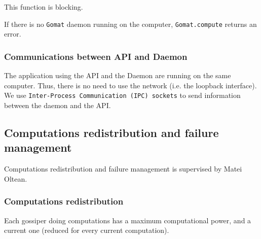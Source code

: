 \documentclass[a4paper,12pt]{article}
\newcommand{\Gomat}{\texttt{Gomat}\xspace}
\begin{document}
    This function is blocking.

    If there is no \Gomat daemon running on the computer, \texttt{Gomat.compute} returns an error.

        \subsubsection{Communications between API and Daemon}
    The application using the API and the Daemon are running on the same computer. Thus, there is no need to use the network (i.e. the loopback interface).
    We use \texttt{Inter-Process Communication (IPC) sockets} to send information between the daemon and the API.

        \subsection{Computations redistribution and failure management}
        Computations redistribution and failure management is supervised by Matei Oltean.

        \subsubsection{Computations redistribution}
    Each gossiper doing computations has a maximum computational power, and a current one (reduced for every current computation).
    
\end{document}
